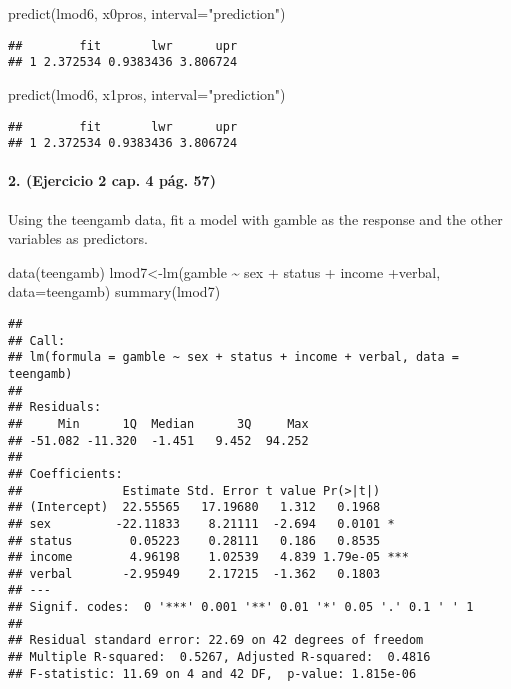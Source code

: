 \documentclass[
]{article}
\newenvironment{Shaded}{\begin{snugshade}}{\end{snugshade}}
\newcommand{\AttributeTok}[1]{\textcolor[rgb]{0.77,0.63,0.00}{#1}}
\newcommand{\FunctionTok}[1]{\textcolor[rgb]{0.00,0.00,0.00}{#1}}
\newcommand{\NormalTok}[1]{#1}
\newcommand{\OtherTok}[1]{\textcolor[rgb]{0.56,0.35,0.01}{#1}}
\newcommand{\SpecialCharTok}[1]{\textcolor[rgb]{0.00,0.00,0.00}{#1}}
\newcommand{\StringTok}[1]{\textcolor[rgb]{0.31,0.60,0.02}{#1}}
\begin{document}
\begin{Shaded}
\begin{Highlighting}[]
\FunctionTok{predict}\NormalTok{(lmod6, x0pros, }\AttributeTok{interval=}\StringTok{"prediction"}\NormalTok{)}
\end{Highlighting}
\end{Shaded}

\begin{verbatim}
##        fit       lwr      upr
## 1 2.372534 0.9383436 3.806724
\end{verbatim}

\begin{Shaded}
\begin{Highlighting}[]
\FunctionTok{predict}\NormalTok{(lmod6, x1pros, }\AttributeTok{interval=}\StringTok{"prediction"}\NormalTok{)}
\end{Highlighting}
\end{Shaded}

\begin{verbatim}
##        fit       lwr      upr
## 1 2.372534 0.9383436 3.806724
\end{verbatim}

\hypertarget{ejercicio-2-cap.-4-puxe1g.-57}{%
\paragraph{2. (Ejercicio 2 cap. 4 pág.
57)}\label{ejercicio-2-cap.-4-puxe1g.-57}}

Using the teengamb data, fit a model with gamble as the response and the
other variables as predictors.

\begin{Shaded}
\begin{Highlighting}[]
\FunctionTok{data}\NormalTok{(teengamb)}
\NormalTok{lmod7}\OtherTok{\textless{}{-}}\FunctionTok{lm}\NormalTok{(gamble }\SpecialCharTok{\textasciitilde{}}\NormalTok{ sex }\SpecialCharTok{+}\NormalTok{ status }\SpecialCharTok{+}\NormalTok{ income }\SpecialCharTok{+}\NormalTok{verbal, }\AttributeTok{data=}\NormalTok{teengamb)}
\FunctionTok{summary}\NormalTok{(lmod7)}
\end{Highlighting}
\end{Shaded}

\begin{verbatim}
## 
## Call:
## lm(formula = gamble ~ sex + status + income + verbal, data = teengamb)
## 
## Residuals:
##     Min      1Q  Median      3Q     Max 
## -51.082 -11.320  -1.451   9.452  94.252 
## 
## Coefficients:
##              Estimate Std. Error t value Pr(>|t|)    
## (Intercept)  22.55565   17.19680   1.312   0.1968    
## sex         -22.11833    8.21111  -2.694   0.0101 *  
## status        0.05223    0.28111   0.186   0.8535    
## income        4.96198    1.02539   4.839 1.79e-05 ***
## verbal       -2.95949    2.17215  -1.362   0.1803    
## ---
## Signif. codes:  0 '***' 0.001 '**' 0.01 '*' 0.05 '.' 0.1 ' ' 1
## 
## Residual standard error: 22.69 on 42 degrees of freedom
## Multiple R-squared:  0.5267, Adjusted R-squared:  0.4816 
## F-statistic: 11.69 on 4 and 42 DF,  p-value: 1.815e-06
\end{verbatim}
\end{document}

